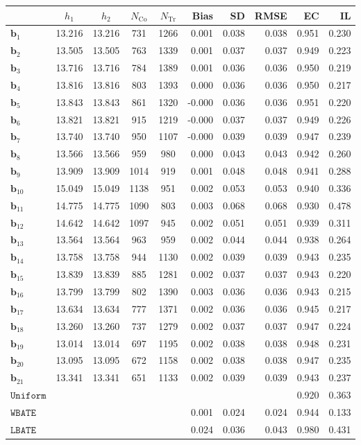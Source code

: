 \documentclass[10pt]{article}
\newcommand{\bb}{\mathbf{b}}
\begin{document}
\begin{table}[p]
    \centering
\begin{tabular}{lccccrrrrr}
\toprule\toprule
 & $h_1$ & $h_2$ & $N_{\mathrm{Co}}$ & $N_{\mathrm{Tr}}$ & Bias & SD & RMSE & EC & IL \\
\midrule
$\bb_{1}$ & 13.216 & 13.216 & 731 & 1266 & 0.001 & 0.038 & 0.038 & 0.951 & 0.230 \\
$\bb_{2}$ & 13.505 & 13.505 & 763 & 1339 & 0.001 & 0.037 & 0.037 & 0.949 & 0.223 \\
$\bb_{3}$ & 13.716 & 13.716 & 784 & 1389 & 0.001 & 0.036 & 0.036 & 0.950 & 0.219 \\
$\bb_{4}$ & 13.816 & 13.816 & 803 & 1393 & 0.000 & 0.036 & 0.036 & 0.950 & 0.217 \\
$\bb_{5}$ & 13.843 & 13.843 & 861 & 1320 & -0.000 & 0.036 & 0.036 & 0.951 & 0.220 \\
$\bb_{6}$ & 13.821 & 13.821 & 915 & 1219 & -0.000 & 0.037 & 0.037 & 0.949 & 0.226 \\
$\bb_{7}$ & 13.740 & 13.740 & 950 & 1107 & -0.000 & 0.039 & 0.039 & 0.947 & 0.239 \\
$\bb_{8}$ & 13.566 & 13.566 & 959 & 980 & 0.000 & 0.043 & 0.043 & 0.942 & 0.260 \\
$\bb_{9}$ & 13.909 & 13.909 & 1014 & 919 & 0.001 & 0.048 & 0.048 & 0.941 & 0.288 \\
$\bb_{10}$ & 15.049 & 15.049 & 1138 & 951 & 0.002 & 0.053 & 0.053 & 0.940 & 0.336 \\
$\bb_{11}$ & 14.775 & 14.775 & 1090 & 803 & 0.003 & 0.068 & 0.068 & 0.930 & 0.478 \\
$\bb_{12}$ & 14.642 & 14.642 & 1097 & 945 & 0.002 & 0.051 & 0.051 & 0.939 & 0.311 \\
$\bb_{13}$ & 13.564 & 13.564 & 963 & 959 & 0.002 & 0.044 & 0.044 & 0.938 & 0.264 \\
$\bb_{14}$ & 13.758 & 13.758 & 944 & 1130 & 0.002 & 0.039 & 0.039 & 0.943 & 0.235 \\
$\bb_{15}$ & 13.839 & 13.839 & 885 & 1281 & 0.002 & 0.037 & 0.037 & 0.943 & 0.220 \\
$\bb_{16}$ & 13.799 & 13.799 & 802 & 1390 & 0.003 & 0.036 & 0.036 & 0.943 & 0.215 \\
$\bb_{17}$ & 13.634 & 13.634 & 777 & 1371 & 0.002 & 0.036 & 0.036 & 0.945 & 0.217 \\
$\bb_{18}$ & 13.260 & 13.260 & 737 & 1279 & 0.002 & 0.037 & 0.037 & 0.947 & 0.224 \\
$\bb_{19}$ & 13.014 & 13.014 & 697 & 1195 & 0.002 & 0.038 & 0.038 & 0.948 & 0.231 \\
$\bb_{20}$ & 13.095 & 13.095 & 672 & 1158 & 0.002 & 0.038 & 0.038 & 0.947 & 0.235 \\
$\bb_{21}$ & 13.341 & 13.341 & 651 & 1133 & 0.002 & 0.039 & 0.039 & 0.943 & 0.237 \\
\midrule
$\mathtt{Uniform}$ &  &  &  &  &  &  &  & 0.920 & 0.363 \\
\midrule
$\mathtt{WBATE}$ &  &  &  &  & 0.001 & 0.024 & 0.024 & 0.944 & 0.133 \\
\midrule
$\mathtt{LBATE}$ &  &  &  &  & 0.024 & 0.036 & 0.043 & 0.980 & 0.431 \\
\bottomrule\bottomrule
\end{tabular}


\end{table}
\end{document}
